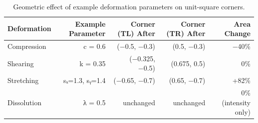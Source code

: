 \begin{table}[htbp]
\caption{Geometric effect of example deformation parameters on unit-square corners.}
\label{tab:geometry}
\begin{tabular}{lrrrr}
\toprule
Deformation & Example Parameter & Corner (TL) After & Corner (TR) After & Area Change \\
\midrule
Compression & c = 0.6 & (−0.5, −0.3) & (0.5, −0.3) & −40\% \\
Shearing & k = 0.35 & (−0.325, −0.5) & (0.675, 0.5) & 0\% \\
Stretching & sₓ=1.3, sᵧ=1.4 & (−0.65, −0.7) & (0.65, −0.7) & +82\% \\
Dissolution & λ = 0.5 & unchanged & unchanged & 0\% (intensity only) \\
\bottomrule
\end{tabular}
\end{table}
